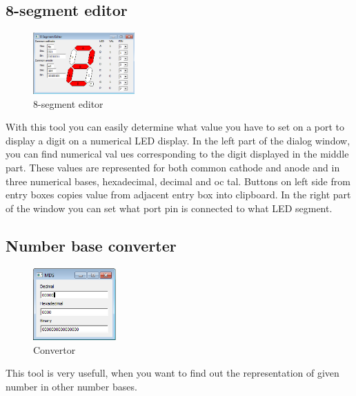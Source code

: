 \subsection{8-segment editor}
    \begin{figure}
        \centering{}
        \includegraphics[width=110pt]{img/8segment.png}
        \caption{8-segment editor}
    \end{figure}
    With this tool you can easily determine what value you have to set on a port to display a digit on a numerical LED display. In the left part of the dialog window, you can find numerical val ues corresponding to the digit displayed in the middle part. These values are represented for both common cathode and anode and in three numerical bases, hexadecimal, decimal and oc tal. Buttons on left side from entry boxes copies value from adjacent entry box into clipboard. In the right part of the window you can set what port pin is connected to what LED segment.

\subsection{Number base converter}
    \begin{figure}
            \centering
            \includegraphics[width=90pt]{img/convertor.png}
            \caption{Convertor}
    \end{figure}
    This tool is very usefull, when you want to find out the representation of given number in other number bases.










    